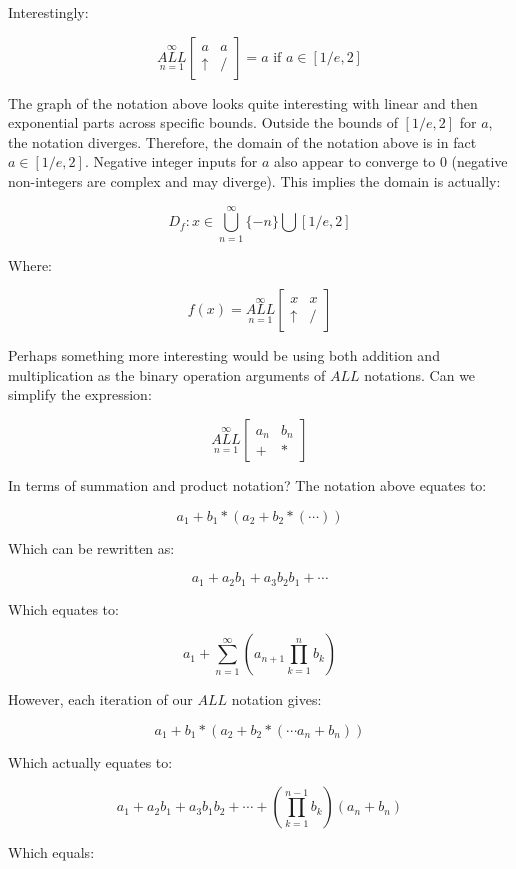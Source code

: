 \documentclass{article}
\begin{document}
Interestingly:

$$\underset{n=1}{\overset{\infty}{ALL}} \begin{bmatrix}
a & a \\
\uparrow & /
\end{bmatrix} =a\text{ if }a\in[1/e,2]$$

The graph of the notation above looks quite interesting with linear and then exponential parts across specific bounds. Outside the bounds of $[1/e,2]$ for $a$, the notation diverges. Therefore, the domain of the notation above is in fact $a\in[1/e,2]$. Negative integer inputs for $a$ also appear to converge to 0 (negative non-integers are complex and may diverge). This implies the domain is actually:

$$D_f: x\in \underset{n=1}{\overset{\infty}{\bigcup}}\{-n\} \bigcup [1/e,2] $$

Where:

$$f(x)=\underset{n=1}{\overset{\infty}{ALL}} \begin{bmatrix}
x & x \\
\uparrow & /
\end{bmatrix}$$

Perhaps something more interesting would be using both addition and multiplication as the binary operation arguments of $ALL$ notations. Can we simplify the expression:

$$\underset{n=1}{\overset{\infty}{ALL}} \begin{bmatrix}
a_n & b_n \\
+ & *
\end{bmatrix}$$

In terms of summation and product notation? The notation above equates to:

$$a_1+b_1*(a_2+b_2*(\cdots))$$

Which can be rewritten as:

$$a_1+a_2b_1+a_3b_2b_1+\cdots$$

Which equates to:

$$ a_1+\underset{n=1}{\overset{\infty}{\sum}} (a_{n+1} \underset{k=1}{\overset{n}{\prod}} b_{k}) $$

However, each iteration of our $ALL$ notation gives:

$$a_1+b_1*(a_2+b_2*(\cdots a_n+b_n))$$

Which actually equates to:

$$a_1+a_2b_1+a_3b_1b_2+\cdots +(\underset{k=1}{\overset{n-1}{\prod}} b_{k})(a_n+b_n)$$

Which equals:
\end{document}
